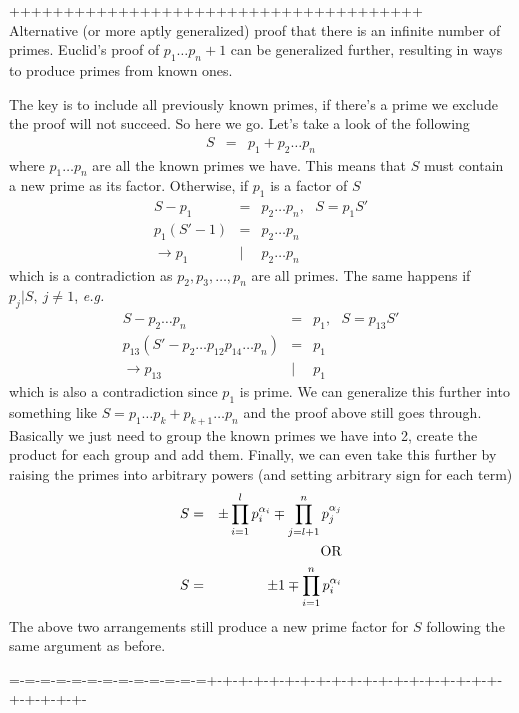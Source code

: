 \documentclass[aps,preprint,preprintnumbers,nofootinbib,showpacs,prd]{revtex4-1}
\newcommand{\eg}{{\it e.g.} }
\newcommand{\nbea}{\begin{eqnarray*}}
\newcommand{\neea}{\end{eqnarray*}}
\begin{document}
++++++++++++++++++++++++++++++++++++++ \\

Alternative (or more aptly generalized) proof that there is an infinite number of primes. Euclid's proof of $p_1 \dots p_n + 1$ can be generalized further, resulting in ways to produce primes from known ones.

The key is to include all previously known primes, if there's a prime we exclude the proof will not succeed. So here we go. Let's take a look of the following
%
\nbea
S & = & p_1 + p_2 \dots p_n
\neea
%
where $p_1 \dots p_n$ are all the known primes we have. This means that $S$ must contain a new prime as its factor. Otherwise, if $p_1$ is a factor of $S$
%
\nbea
S - p_1 & = & p_2 \dots p_n, ~~~ S = p_1 S' \\
p_1(S' - 1) & = & p_2 \dots p_n \\
\to p_1 &|& p_2 \dots p_n
\neea
which is a contradiction as $p_2, p_3, \dots, p_n$ are all primes. The same happens if $p_j | S,~j \neq 1$, \eg
%
\nbea
S - p_2 \dots p_n & = & p_1, ~~~ S = p_{13} S' \\
p_{13}(S' - p_2 \dots p_{12}p_{14} \dots p_n) & = & p_1 \\
\to p_{13} &|& p_1
\neea
%
which is also a contradiction since $p_1$ is prime. We can generalize this further into something like $S = p_1 \dots p_k + p_{k+1} \dots p_n$ and the proof above still goes through. Basically we just need to group the known primes we have into 2, create the product for each group and add them. Finally, we can even take this further by raising the primes into arbitrary powers (and setting arbitrary sign for each term)
%
\nbea
S & = & \pm \prod_{i=1}^{l}p_{i}^{\alpha_i} \mp \prod_{j=l+1}^{n}p_{j}^{\alpha_j} \\
& &  ~~~~~{\rm OR}\\
S & = & \pm 1 \mp \prod_{i=1}^{n}p_{i}^{\alpha_i}
\neea
%
The above two arrangements still produce a new prime factor for $S$ following the same argument as before. 



=-=-=-=-=-=-=-=-=-=-=-=-=+-+-+-+-+-+-+-+-+-+-+-+-+-+-+-+-+-+-+-+-+-+-+-+-
\end{document}
